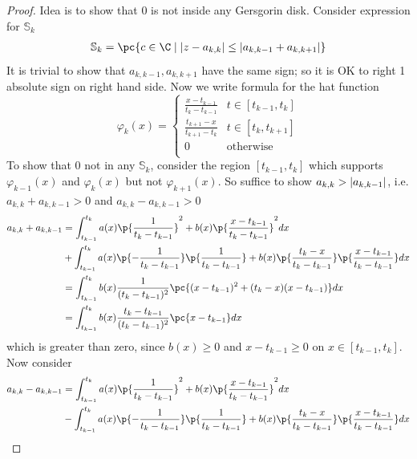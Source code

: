 \documentclass[11pt]{article}
\begin{document}
\begin{proof}
    Idea is to show that 0 is not inside any Gersgorin disk. Consider expression for $\mathbb{S}_k$
    \begin{align*}
        \mathbb{S}_k = \pc{
            c \in \C \mid \abs{z - a_{k,k}} \leq \abs{a_{k,k-1} + a_{k,k+1}}
        }
    \end{align*}
    It is trivial to show that $a_{k,k-1},a_{k,k+1}$ have the same sign; so it is OK to right 1 absolute sign on right hand side. Now we write formula for the hat function 
    \[
        \varphi_k(x) = 
        \begin{cases}
            \frac{x-t_{k-1}}{t_k - t_{k-1}} & t \in [t_{k-1}, t_k] \\
            \frac{t_{k+1} - x}{t_{k+1} - t_k} & t \in [t_k, t_{k+1}] \\
            0 & \text{otherwise} \\
        \end{cases}    
    \]
    To show that 0 not in any $\mathbb{S}_k$, consider the region $[t_{k-1},t_k]$ which supports $\varphi_{k-1}(x)$ and $\varphi_k(x)$ but not $\varphi_{k+1}(x)$. So suffice to show $a_{k,k} > \left|a_{k,k-1}\right|$, i.e. $a_{k,k} + a_{k,k-1} > 0$ and $a_{k,k} - a_{k,k-1} > 0$
    \begin{align*}
        a_{k,k} + a_{k,k-1}
        &= \int_{t_{k-1}}^{t_k} a(x) \p{\frac{1}{t_k - t_{k-1}}}^2 + b(x) \p{\frac{x-t_{k-1}}{t_k - t_{k-1}}}^2 dx \\
        &+ \int_{t_{k-1}}^{t_k} a(x) \p{-\frac{1}{t_k-t_{k-1}}}\p{\frac{1}{t_k - t_{k-1}}} + b(x) \p{\frac{t_k-x}{t_k-t_{k-1}}} \p{ \frac{x-t_{k-1}}{t_k - t_{k-1}} } dx \\
        &= \int_{t_{k-1}}^{t_k} b(x) \frac{1}{(t_k-t_{k-1})^2} \pc{
            (x-t_{k-1})^2 + (t_k-x)(x-t_{k-1})
        } dx \\ 
        &= \int_{t_{k-1}}^{t_k} b(x) \frac{t_k-t_{k-1}}{(t_k-t_{k-1})^2} \pc{x - t_{k-1}} dx
    \end{align*}
    which is greater than zero, since $b(x) \geq 0$ and $x-t_{k-1} \geq 0$ on $x\in [t_{k-1}, t_k]$. Now consider
    \begin{align*}
        a_{k,k}-a_{k,k-1}
        &= \int_{t_{k-1}}^{t_k} a(x) \p{\frac{1}{t_k - t_{k-1}}}^2 + b(x) \p{\frac{x-t_{k-1}}{t_k - t_{k-1}}}^2 dx \\
        &- \int_{t_{k-1}}^{t_k} a(x) \p{-\frac{1}{t_k-t_{k-1}}}\p{\frac{1}{t_k - t_{k-1}}} + b(x) \p{\frac{t_k-x}{t_k-t_{k-1}}} \p{ \frac{x-t_{k-1}}{t_k - t_{k-1}} } dx \\

\end{align*}
\end{proof}
\end{document}

